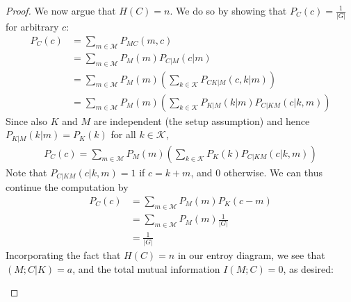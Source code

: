 \begin{proof}
We now argue that $H(C) = n$. We do so by showing that $P_C(c) = \frac{1}{|G|}$ for arbitrary $c$: 
\begin{align}
P_C(c) &= \sum_{m \in \mathcal{M}} P_{MC}(m,c)\nonumber\\
&= \sum_{m \in \mathcal{M}} P_M(m) P_{C|M}(c|m)\nonumber\\
&= \sum_{m \in \mathcal{M}} P_M(m) \left(\sum_{k \in \mathcal{K}} P_{CK|M}(c,k|m)\right)\nonumber\\
&= \sum_{m \in \mathcal{M}} P_M(m) \left(\sum_{k \in \mathcal{K}} P_{K|M}(k|m) P_{C|KM}(c|k,m)\right)
\end{align}
Since also $K$ and $M$ are independent (the setup assumption) and hence $P_{K|M}(k|m) = P_K(k)$ for all $k \in \mathcal{K}$,
\begin{align}
P_C(c) = \sum_{m \in \mathcal{M}} P_M(m) \left(\sum_{k \in \mathcal{K}} P_{K}(k) P_{C|KM}(c|k,m)\right)
\end{align}
Note that $P_{C|KM}(c|k,m) = 1$ if $c = k + m$, and 0 otherwise. We can thus continue the computation by
\begin{align}
P_C(c) &= \sum_{m \in \mathcal{M}} P_M(m) P_K(c - m)\nonumber\\
&= \sum_{m \in \mathcal{M}} P_M(m) \frac{1}{|G|}\nonumber\\
&= \frac{1}{|G|}
\end{align}
Incorporating the fact that $H(C) = n$ in our entroy diagram, we see that $(M;C|K) = a$, and the total mutual information $I(M;C) = 0$, as desired:
\begin{center}
\end{center}


\end{proof}

